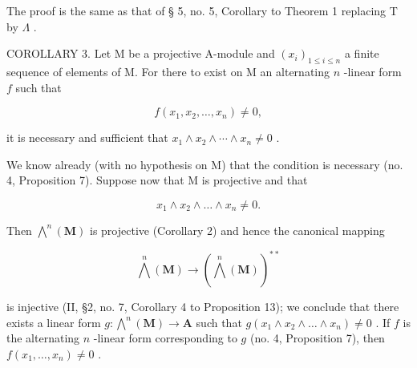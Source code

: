 The proof is the same as that of § 5, no. 5, Corollary to Theorem 1 replacing T by \(\Lambda\) .

COROLLARY 3. Let M be a projective A-module and \((x_{i})_{1\leqslant i\leqslant n}\) a finite sequence of elements of M. For there to exist on M an alternating \(n\) -linear form \(f\) such that

\[
f (x _ {1}, x _ {2}, \dots , x _ {n}) \neq 0,
\]

it is necessary and sufficient that \(x_{1} \wedge x_{2} \wedge \cdots \wedge x_{n} \neq 0\) .

We know already (with no hypothesis on M) that the condition is necessary (no. 4, Proposition 7). Suppose now that M is projective and that

\[
x _ {1} \wedge x _ {2} \wedge \dots \wedge x _ {n} \neq 0.
\]

Then \(\bigwedge^n (\mathbf{M})\) is projective (Corollary 2) and hence the canonical mapping

\[
\bigwedge^ {n} (\mathbf {M}) \rightarrow (\bigwedge^ {n} (\mathbf {M})) ^ {* *}
\]

is injective (II, §2, no. 7, Corollary 4 to Proposition 13); we conclude that there exists a linear form \(g: \bigwedge^{n}(\mathbf{M}) \to \mathbf{A}\) such that \(g(x_{1} \wedge x_{2} \wedge \dots \wedge x_{n}) \neq 0\) . If \(f\) is the alternating \(n\) -linear form corresponding to \(g\) (no. 4, Proposition 7), then \(f(x_{1}, \ldots, x_{n}) \neq 0\) .

